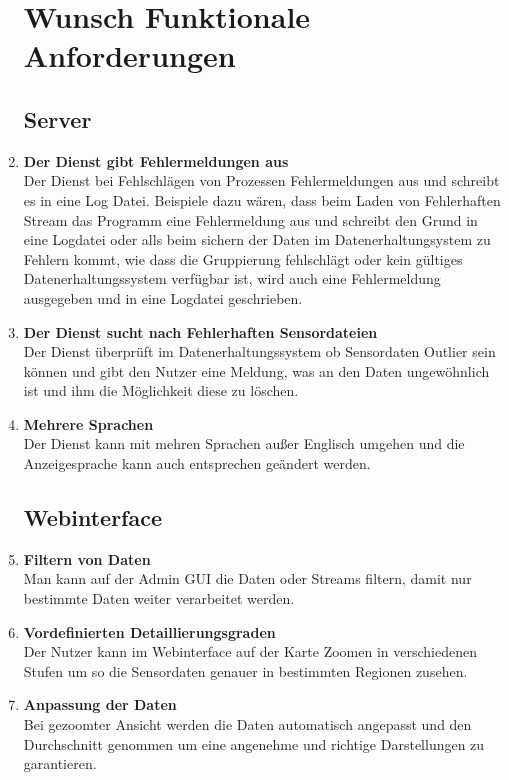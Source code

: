 \begin{enumerate}[label=\textbf{WF\arabic{enumi}0}]
	\setcounter{enumi}{99}
	\section{Wunsch Funktionale Anforderungen}
	
	\subsection{Server}
	
	\item \textbf{Der Dienst gibt Fehlermeldungen aus}\\
	Der Dienst bei Fehlschlägen von Prozessen Fehlermeldungen aus und schreibt es in eine Log Datei. Beispiele dazu wären, dass beim Laden von Fehlerhaften Stream das Programm eine Fehlermeldung aus und schreibt den Grund in eine Logdatei oder alls beim sichern der Daten im Datenerhaltungsystem zu Fehlern kommt, wie dass die Gruppierung fehlschlägt oder kein gültiges Datenerhaltungssystem verfügbar ist, wird auch eine Fehlermeldung ausgegeben und in eine Logdatei geschrieben.
	
	\item \textbf{Der Dienst sucht nach Fehlerhaften Sensordateien}\\
	Der Dienst überprüft im Datenerhaltungssystem ob Sensordaten Outlier sein können und gibt den Nutzer eine Meldung, was an den Daten ungewöhnlich ist und ihm die Möglichkeit diese zu löschen.
	 
	\item \textbf{Mehrere Sprachen}\\
	Der Dienst kann mit mehren Sprachen außer Englisch umgehen und die Anzeigesprache kann auch entsprechen geändert werden. 
	
	
	
		
	\subsection{Webinterface}
	\item \textbf{Filtern von Daten}\\
	Man kann auf der Admin GUI die Daten oder Streams filtern, damit nur bestimmte Daten weiter verarbeitet werden.
	
	\item \textbf{Vordefinierten Detaillierungsgraden}\\
	Der Nutzer kann im Webinterface auf der Karte Zoomen in verschiedenen Stufen um so die Sensordaten genauer in bestimmten Regionen zusehen.
	
	\item \textbf{Anpassung der Daten}\\
	Bei gezoomter Ansicht werden die Daten automatisch angepasst und den Durchschnitt genommen um eine angenehme und richtige Darstellungen zu garantieren.
\end{enumerate}
	
	 
	  
